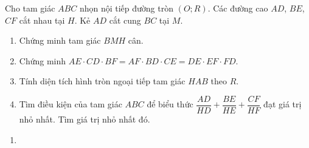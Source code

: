 \begin{ex}
{\begin{enumerate}
\end{enumerate}
	
	}
\end{ex}


\begin{ex} %
	Cho tam giác $ABC$ nhọn nội tiếp đường tròn $\left(O;R\right)$. Các đường cao $AD$, $BE$, $CF$ cắt nhau tại $H$. Kẻ $AD$ cắt cung $BC$ tại $M$.
	\begin{enumerate}
		\item Chứng minh tam giác $BMH$ cân.
		\item Chứng minh $AE\cdot CD\cdot BF =  AF\cdot BD\cdot CE = DE\cdot EF\cdot FD$.
		\item Tính diện tích hình tròn ngoại tiếp tam giác $HAB$ theo $R$.
		\item Tìm điều kiện của tam giác $ABC$ để biểu thức $\dfrac{AD}{HD} + \dfrac{BE}{HE} + \dfrac{CF}{HF}$ đạt giá trị nhỏ nhất. Tìm giá trị nhỏ nhất đó.
	\end{enumerate}
	\loigiai
	{\begin{enumerate}
	\item  
\end{enumerate}}
\end{ex}
